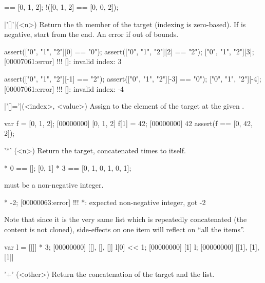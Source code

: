 \begin{urbiscriptapi}
\begin{urbiassert}
[0, 1, 2] == [0, 1, 2];
!([0, 1, 2] == [0, 0, 2]);
\end{urbiassert}

\item|'[]'|(<n>)%
  Return the th member of the target (indexing is
  zero-based). If  is negative, start from the end.  An error
  if out of bounds.

\begin{urbiscript}
assert(["0", "1", "2"][0] == "0");
assert(["0", "1", "2"][2] == "2");
["0", "1", "2"][3];
[00007061:error] !!! []: invalid index: 3

assert(["0", "1", "2"][-1] == "2");
assert(["0", "1", "2"][-3] == "0");
["0", "1", "2"][-4];
[00007061:error] !!! []: invalid index: -4
\end{urbiscript}

\item|'[]='|(<index>, <value>)%
  Assign  to the element of the target at the given
  .

\begin{urbiscript}
var f = [0, 1, 2];
[00000000] [0, 1, 2]
f[1] = 42;
[00000000] 42
assert(f == [0, 42, 2]);
\end{urbiscript}

\item['*'](<n>)%
  Return the target, concatenated  times to itself.
\begin{urbiassert}
[0, 1] * 0 == [];
[0, 1] * 3 == [0, 1, 0, 1, 0, 1];
\end{urbiassert}

   must be a non-negative integer.

\begin{urbiscript}
[0, 1] * -2;
[00000063:error] !!! *: expected non-negative integer, got -2
\end{urbiscript}


  Note that since it is the very same list which is repeatedly
  concatenated (the content is not cloned), side-effects on one item
  will reflect on ``all the items''.

\begin{urbiscript}
var l = [[]] * 3;
[00000000] [[], [], []]
l[0] << 1;
[00000000] [1]
l;
[00000000] [[1], [1], [1]]
\end{urbiscript}

\item['+'](<other>)%
  Return the concatenation of the target and the  list.


\end{urbiscriptapi}
